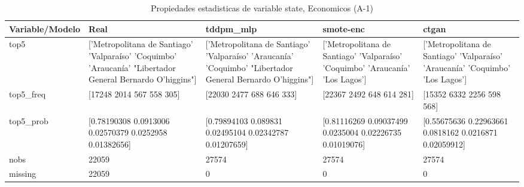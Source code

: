 \begin{table}[H]
\centering
\fontsize{8}{14}\selectfont
\caption{Propiedades  estadisticas de variable state, Economicos (A-1)}
\label{table-stats-economicos-a-1-state}
\begin{tabular}{|l|m{10em}|m{10em}|m{10em}|m{10em}|}
\hline
 \rowcolor[gray]{0.8}
Variable/Modelo & Real & tddpm\_mlp & smote-enc & ctgan \\
\hline top5 & ['Metropolitana de Santiago' 'Valparaíso' 'Coquimbo' 'Araucanía'
 "Libertador General Bernardo O'higgins"] & ['Metropolitana de Santiago' 'Valparaíso' 'Araucanía' 'Coquimbo'
 "Libertador General Bernardo O'higgins"] & ['Metropolitana de Santiago' 'Valparaíso' 'Coquimbo' 'Araucanía'
 'Los Lagos'] & ['Metropolitana de Santiago' 'Valparaíso' 'Araucanía' 'Coquimbo'
 'Los Lagos'] \\
\hline top5\_freq & [17248  2014   567   558   305] & [22030  2477   688   646   333] & [22367  2492   648   614   281] & [15352  6332  2256   598   568] \\
\hline top5\_prob & [0.78190308 0.0913006  0.02570379 0.0252958  0.01382656] & [0.79894103 0.089831   0.02495104 0.02342787 0.01207659] & [0.81116269 0.09037499 0.0235004  0.02226735 0.01019076] & [0.55675636 0.22963661 0.0818162  0.0216871  0.02059912] \\
\hline nobs & 22059 & 27574 & 27574 & 27574 \\
\hline missing & 22059 & 0 & 0 & 0 \\
\hline
\end{tabular}
\end{table}
